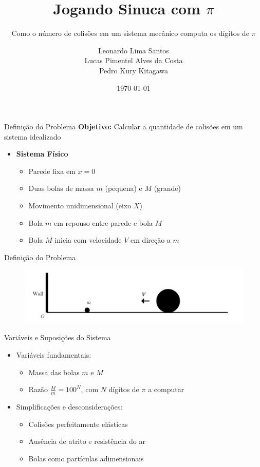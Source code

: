 \documentclass{beamer}
\title{Jogando Sinuca com $\pi$}
\subtitle{Como o número de colisões em um sistema mecânico computa os dígitos de $\pi$}
\author{Leonardo Lima Santos \\ Lucas Pimentel Alves da Costa \\ Pedro Kury Kitagawa}
\date{\today}
\begin{document}
\maketitle

\begin{frame}{Definição do Problema}
  \textbf{Objetivo:} Calcular a quantidade de colisões em um sistema idealizado
  \begin{itemize}
    \item \textbf{Sistema Físico}
      \begin{itemize}
        \item Parede fixa em $x = 0$
        \item Duas bolas de massa $m$ (pequena) e $M$ (grande)
        \item Movimento unidimensional (eixo $X$)
        \item Bola $m$ em repouso entre parede e bola $M$
        \item Bola $M$ inicia com velocidade $V$ em direção a $m$
      \end{itemize}
  \end{itemize}
\end{frame}

\begin{frame}{Definição do Problema}
  \begin{figure}
    \centering
    \includegraphics[width=1\textwidth]{images/image.png}
  \end{figure}
\end{frame}

\begin{frame}{Variáveis e Suposições do Sistema}
  \begin{itemize}
    \item Variáveis fundamentais:
      \begin{itemize}
        \item Massa das bolas $m$ e $M$
        \item Razão $\tfrac{M}{m} = 100^N$, com $N$ dígitos de $\pi$ a computar
      \end{itemize}
    \item Simplificações e desconsiderações:
      \begin{itemize}
        \item Colisões perfeitamente elásticas
        \item Ausência de atrito e resistência do ar
        \item Bolas como partículas adimensionais
      \end{itemize}
  \end{itemize}
\end{frame}
\end{document}
